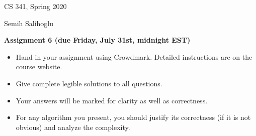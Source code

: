 \documentclass[11pt]{article}
\begin{document}
\hfill CS 341, Spring 2020\par
\hfill Semih Salihoglu

\bigskip
\begin{center}\large\bf Assignment 6 (due Friday, July 31st, midnight EST)
\end{center}

\begin{itemize}
\item Hand in your assignment using Crowdmark. Detailed instructions are on the course website.
\item Give complete legible solutions to all questions.
\item Your answers will be marked for clarity as well as correctness.
\item For any algorithm you present, you should justify its correctness
(if it is not obvious) and analyze the complexity.
\end{itemize}
\end{document}
